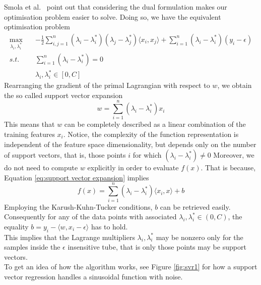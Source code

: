 Smola et al.\ \cite{smola2004tutorial} point out that considering the dual formulation makes our optimisation problem easier to solve. Doing so, we have the equivalent optimisation problem
\begin{equation}
    \begin{aligned}
        \max_{\lambda_i, \lambda_i^*} \quad& -\frac{1}{2}\sum\limits_{i,j=1}^n(\lambda_i-\lambda_i^*)(\lambda_j-\lambda_j^*)\langle x_i,x_j\rangle +\sum\limits_{i=1}^n(\lambda_i-\lambda_i^*)(y_i-\epsilon)
        \\
        s.t. \quad& \sum\limits_{i=1}^n(\lambda_i-\lambda_i^*)=0
        \\
        \quad& \lambda_i, \lambda_i^* \in [0, C]
    \end{aligned}
\end{equation}
Rearranging the gradient of the primal Lagrangian with respect to $w$, we obtain the so called support vector expansion
\begin{equation}\label{eq:support vector expansion}
    w=\sum\limits_{i=1}^n(\lambda_i-\lambda_i^*)x_i
\end{equation}
This means that $w$ can be completely described as a linear combination of the training features $x_i$.
Notice, the complexity of the function representation is independent of the feature space dimensionality, but depends only on the number of support vectors, that is, those points $i$ for which $(\lambda_i-\lambda_i^*)\neq 0$
Moreover, we do not need to compute $w$ explicitly in order to evaluate $f(x)$.
That is because, Equation \ref{eq:support vector expansion} implies
\begin{equation}
    f(x)=\sum\limits_{i=1}^n(\lambda_i-\lambda_i^*)\langle x_i, x\rangle +b
\end{equation}
Employing the Karush-Kuhn-Tucker conditions, $b$ can be retrieved easily. 
Consequently for any of the data points with associated $\lambda_i, \lambda^*_i \in (0,C)$, the equality $b=y_i-\langle w, x_i-\epsilon\rangle$ has to hold.
\\
This implies that the Lagrange multipliers $\lambda_i, \lambda_i^*$ may be nonzero only for the samples inside the $\epsilon$ insensitive tube, that is only those points may be support vectors. 
\\
To get an idea of how the algorithm works, see Figure \ref{fig:svr1} for how a support vector regression handles a sinusoidal function with noise.
\\

